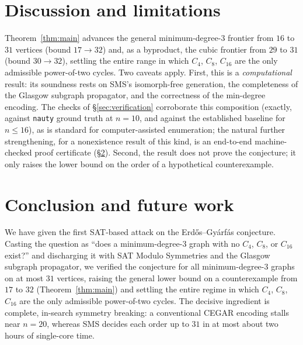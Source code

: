 \documentclass[11pt]{article}
\begin{document}
\section{Discussion and limitations}
\label{sec:limitations}

Theorem~\ref{thm:main} advances the general minimum-degree-3 frontier from $16$ to
$31$ vertices (bound $17 \to 32$) and, as a byproduct, the cubic frontier from
$29$ to $31$ (bound $30 \to 32$), settling the entire range in which $C_4$, $C_8$,
$C_{16}$ are the only admissible power-of-two cycles. Two caveats apply. First, this is a
\emph{computational} result: its soundness rests on SMS's isomorph-free generation,
the completeness of the Glasgow subgraph propagator, and the correctness of the
min-degree encoding. The checks of \S\ref{sec:verification} corroborate this
composition (exactly, against \texttt{nauty} ground truth at $n=10$, and against
the established baseline for $n \le 16$), as is standard for computer-assisted
enumeration; the natural further strengthening, for a nonexistence result of this
kind, is an end-to-end machine-checked proof certificate (\S\ref{sec:conclusion}).
Second, the result does not prove the conjecture; it only raises the lower bound on
the order of a hypothetical counterexample.

\section{Conclusion and future work}
\label{sec:conclusion}

We have given the first SAT-based attack on the Erd\H{o}s--Gy\'arf\'as conjecture.
Casting the question as ``does a minimum-degree-3 graph with no $C_4$, $C_8$, or
$C_{16}$ exist?'' and discharging it with SAT Modulo Symmetries and the Glasgow
subgraph propagator, we verified the conjecture for all minimum-degree-3 graphs on
at most $31$ vertices, raising the general lower bound on a counterexample from
$17$ to $32$ (Theorem~\ref{thm:main}) and settling the entire regime in which
$C_4$, $C_8$, $C_{16}$ are the only admissible power-of-two cycles. The decisive
ingredient is complete, in-search symmetry breaking: a conventional CEGAR encoding
stalls near $n=20$, whereas SMS decides each order up to $31$ in at most about two
hours of single-core time.
\end{document}
